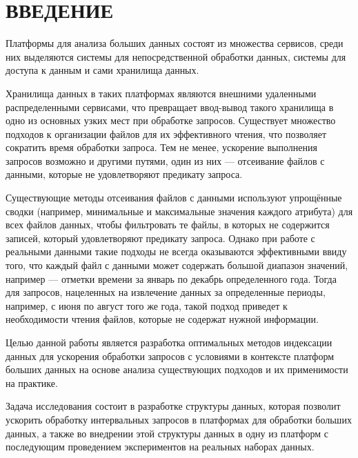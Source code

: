 \section*{ВВЕДЕНИЕ}

Платформы для анализа больших данных состоят из множества сервисов, среди них  выделяются системы для непосредственной обработки данных, системы для доступа к данным и сами хранилища данных.

Хранилища данных в таких платформах являются внешними удаленными распределенными сервисами, что превращает ввод-вывод такого хранилища в одно из основных узких мест при обработке запросов. Существует множество подходов к организации файлов для их эффективного чтения, что позволяет сократить время  обработки запроса. Тем не менее, ускорение выполнения запросов возможно и другими путями, один из них --- отсеивание файлов с данными, которые не удовлетворяют предикату запроса.

Существующие методы отсеивания файлов с данными используют упрощённые сводки (например, минимальные и максимальные значения каждого атрибута) для всех файлов данных, чтобы фильтровать те файлы, в которых не содержится записей, который удовлетворяют предикату запроса. Однако при работе с реальными данными такие подходы не всегда оказываются эффективными ввиду того, что каждый файл с данными может содержать большой диапазон значений, например --- отметки времени за январь по декабрь определенного года. Тогда для запросов, нацеленных на извлечение данных за определенные периоды, например, с июня по август того же года, такой подход приведет к необходимости чтения файлов, которые не содержат нужной информации.

Целью данной работы является разработка оптимальных методов индексации данных для ускорения обработки запросов с условиями в контексте платформ больших данных на основе анализа существующих подходов и их применимости на практике.

Задача исследования состоит в разработке структуры данных, которая позволит ускорить обработку интервальных запросов в платформах для обработки больших данных, а также во внедрении этой структуры данных в одну из платформ с последующим проведением экспериментов на реальных наборах данных.
